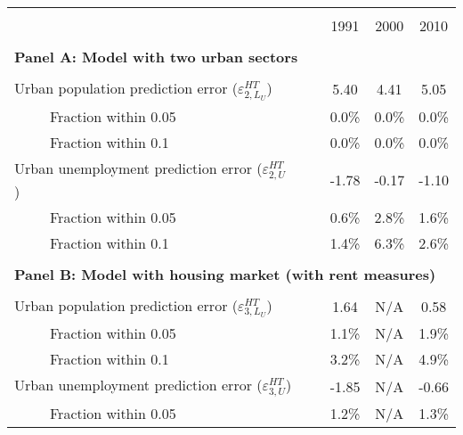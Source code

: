 \begin{tabular}{lrrr}
\toprule &       &       &  \\
      & \multicolumn{1}{c}{1991} & \multicolumn{1}{c}{2000} & \multicolumn{1}{c}{2010} \bigstrut[b]\\
\cline{2-4}      &       &       &  \bigstrut[t]\\
\multicolumn{4}{l}{\textbf{Panel A: Model with two urban sectors}} \\
      &       &       &  \\
Urban population prediction error ($\varepsilon_{2,L_{U}}^{HT}$) & \multicolumn{1}{c}{5.40} & \multicolumn{1}{c}{4.41} & \multicolumn{1}{c}{5.05} \\
~~~~~Fraction within 0.05 & \multicolumn{1}{c}{0.0\%} & \multicolumn{1}{c}{0.0\%} & \multicolumn{1}{c}{0.0\%} \\
\medskip ~~~~~Fraction within 0.1 & \multicolumn{1}{c}{0.0\%} & \multicolumn{1}{c}{0.0\%} & \multicolumn{1}{c}{0.0\%} \\
Urban unemployment prediction error ($\varepsilon_{2,U}^{HT}$)~~~~~~ & \multicolumn{1}{c}{-1.78} & \multicolumn{1}{c}{-0.17} & \multicolumn{1}{c}{-1.10} \\
~~~~~Fraction within 0.05 & \multicolumn{1}{c}{0.6\%} & \multicolumn{1}{c}{2.8\%} & \multicolumn{1}{c}{1.6\%} \\
~~~~~Fraction within 0.1 & \multicolumn{1}{c}{1.4\%} & \multicolumn{1}{c}{6.3\%} & \multicolumn{1}{c}{2.6\%} \\
      &       &       &  \\
\multicolumn{4}{l}{\textbf{Panel B: Model with  housing market (with rent measures)}} \\
      &       &       &  \\
Urban population prediction error ($\varepsilon_{3,L_{U}}^{HT}$) & \multicolumn{1}{c}{1.64} & \multicolumn{1}{c}{N/A} & \multicolumn{1}{c}{0.58} \\
~~~~~Fraction within 0.05 & \multicolumn{1}{c}{1.1\%} & \multicolumn{1}{c}{N/A} & \multicolumn{1}{c}{1.9\%} \\
\medskip ~~~~~Fraction within 0.1 & \multicolumn{1}{c}{3.2\%} & \multicolumn{1}{c}{N/A} & \multicolumn{1}{c}{4.9\%} \\
Urban unemployment prediction error ($\varepsilon_{3,U}^{HT}$) & \multicolumn{1}{c}{-1.85} & \multicolumn{1}{c}{N/A} & \multicolumn{1}{c}{-0.66} \\
~~~~~Fraction within 0.05 & \multicolumn{1}{c}{1.2\%} & \multicolumn{1}{c}{N/A} & \multicolumn{1}{c}{1.3\%} \\

\end{tabular}
